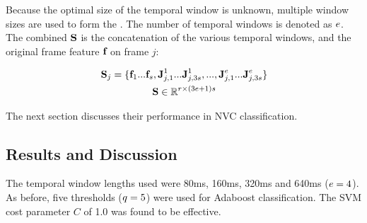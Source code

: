 Because the optimal size of the temporal window is unknown, multiple window sizes are used to form the \temporalFeatPlural. The number of temporal windows is denoted as $e$. The combined \temporalFeatSingle{ }$\textbf{S}$ is the concatenation of the various temporal windows, and the original frame feature $\textbf{f}$ on frame $j$:

\begin{gather}
\textbf{S}_{j} = \{\textbf{f}_1...\textbf{f}_{s},\textbf{J}^1_{j,1}...\textbf{J}^1_{j,3 s},...,\textbf{J}^e_{j,1}...\textbf{J}^e_{j, 3 s}\} \\
\textbf{S} \in \mathbb{R}^{r \times (3 e + 1) s}
\end{gather}

The next section discusses their performance in \ac{NVC} classification.

\subsection{Results and Discussion}

The temporal window lengths used were 80ms, 160ms, 320ms and 640ms ($e = 4$). As before, five thresholds ($q = 5$) were used for Adaboost classification. The SVM cost parameter $C$ of 1.0 was found to be effective.



